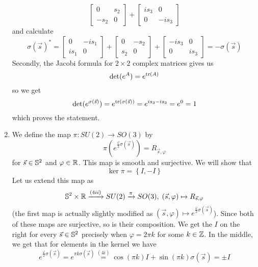 \documentclass[a4paper, 12pt]{article}
\begin{document}
\begin{Exercise}
\begin{enumerate}[label=(\roman*)]
\[\begin{bmatrix}
                    0 & s_2 \\
                    -s_2 & 0
                \end{bmatrix}
                +
                \begin{bmatrix}
                    is_3 & 0 \\
                    0 & -is_3
                \end{bmatrix}
            \]
            and calculate
            \[
                \sigma(\vec{s})^*
                =
                \begin{bmatrix}
                    0 & -is_1 \\
                    is_1 & 0
                \end{bmatrix}
                +
                \begin{bmatrix}
                    0 & -s_2 \\
                    s_2 & 0
                \end{bmatrix}
                +
                \begin{bmatrix}
                    -is_3 & 0 \\
                    0 & is_3
                \end{bmatrix}
                = -\sigma(\vec{s})
            \]
            Secondly, the Jacobi formula for $2\times 2$ complex matrices gives us
            \[
                \det(e^{A}) = e^{\tr(A)}
            \]
            so we get
            \[
                \det(e^{\sigma(\vec{s})}) = e^{\tr(\sigma(\vec{s}))} = e^{is_3 - is_3} = e^{0} = 1
            \]
            which proves the statement.
        \item We define the map $\pi \colon SU(2) \to SO(3)$ by
            \[
                \pi\left( e^{\frac{\varphi}{2}\sigma(\vec{s})} \right) = R_{\vec{s},\varphi}
            \]
            for $\vec{s} \in \S^2$ and $\varphi \in \R$.
            This map is smooth and surjective. We will show that
            \[
                \ker\pi = \left\{ I, -I \right\}
            \]
            Let us extend this map as
            \[
                \S^2 \times \R \xrightarrow{(4ii)} SU(2) \xrightarrow{\pi} SO(3), \; (\vec{s}, \varphi) \mapsto R_{\vec{s},\varphi}
            \]
            (the first map is actually slightly modified as $(\vec{s}, \varphi) \mapsto e^{\frac{\varphi}{2}\sigma(\vec{s})}$).
            Since both of these maps are surjective, so is their composition.
            We get the $I$ on the right for every $\vec{s} \in \S^2$ precisely when $\varphi = 2\pi k$ for some $k \in \Z$.
            In the middle, we get that for elements in the kernel we have
            \[
                e^{\frac{\varphi}{2}\sigma(\vec{s})}
                = e^{\pi k \sigma(\vec{s})}
                \overset{(4i)}{=} \cos(\pi k) I + \sin(\pi k) \sigma(\vec{s}) = \pm I
            \]
            

\end{enumerate}
\end{Exercise}
\end{document}
